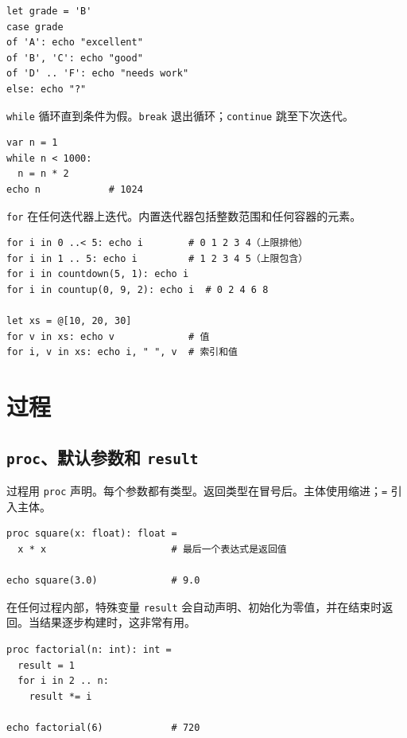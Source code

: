 \documentclass[justified, sixbynine]{tufte-book}
\def\ft{\small\tt}
\theoremstyle{plain}%
\newtheorem * {corollary}{推论}
\theoremstyle{definition}
\theoremstyle{remark}
\newtheorem * {remark}{注记}
\newtheorem * {note}{注释}
\begin{document}
\begin{fullwidth}
\begin{lstlisting}
let grade = 'B'
case grade
of 'A': echo "excellent"
of 'B', 'C': echo "good"
of 'D' .. 'F': echo "needs work"
else: echo "?"
\end{lstlisting}

{\ft while} 循环直到条件为假。{\ft break} 退出循环；{\ft continue} 跳至下次迭代。

\begin{lstlisting}
var n = 1
while n < 1000:
  n = n * 2
echo n            # 1024
\end{lstlisting}

{\ft for} 在任何迭代器上迭代。内置迭代器包括整数范围和任何容器的元素。

\begin{lstlisting}
for i in 0 ..< 5: echo i        # 0 1 2 3 4（上限排他）
for i in 1 .. 5: echo i         # 1 2 3 4 5（上限包含）
for i in countdown(5, 1): echo i
for i in countup(0, 9, 2): echo i  # 0 2 4 6 8

let xs = @[10, 20, 30]
for v in xs: echo v             # 值
for i, v in xs: echo i, " ", v  # 索引和值
\end{lstlisting}

\goodbreak\section{过程}

\goodbreak\subsection{{\ft proc}、默认参数和 {\ft result}}


过程用 {\ft proc} 声明。每个参数都有类型。返回类型在冒号后。主体使用缩进；{\ft =} 引入主体。

\begin{lstlisting}
proc square(x: float): float =
  x * x                      # 最后一个表达式是返回值

echo square(3.0)             # 9.0
\end{lstlisting}

在任何过程内部，特殊变量 {\ft result} 会自动声明、初始化为零值，并在结束时返回。当结果逐步构建时，这非常有用。

\begin{lstlisting}
proc factorial(n: int): int =
  result = 1
  for i in 2 .. n:
    result *= i

echo factorial(6)            # 720
\end{lstlisting}


\end{fullwidth}
\end{document}
